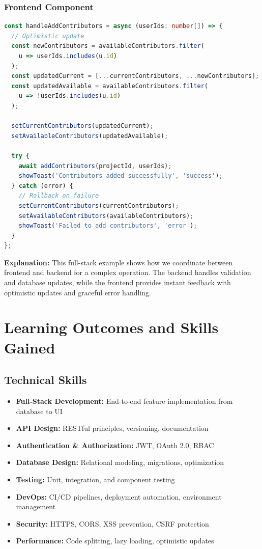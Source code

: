 \documentclass[11pt,a4paper]{article}
\begin{document}
\subsubsection{Frontend Component}
\begin{lstlisting}[language=TypeScript]
const handleAddContributors = async (userIds: number[]) => {
  // Optimistic update
  const newContributors = availableContributors.filter(
    u => userIds.includes(u.id)
  );
  const updatedCurrent = [...currentContributors, ...newContributors];
  const updatedAvailable = availableContributors.filter(
    u => !userIds.includes(u.id)
  );
  
  setCurrentContributors(updatedCurrent);
  setAvailableContributors(updatedAvailable);
  
  try {
    await addContributors(projectId, userIds);
    showToast('Contributors added successfully', 'success');
  } catch (error) {
    // Rollback on failure
    setCurrentContributors(currentContributors);
    setAvailableContributors(availableContributors);
    showToast('Failed to add contributors', 'error');
  }
};
\end{lstlisting}

\textbf{Explanation:} This full-stack example shows how we coordinate between frontend and backend for a complex operation. The backend handles validation and database updates, while the frontend provides instant feedback with optimistic updates and graceful error handling.

\section{Learning Outcomes and Skills Gained}

\subsection{Technical Skills}
\begin{itemize}[leftmargin=*]
    \item \textbf{Full-Stack Development:} End-to-end feature implementation from database to UI
    \item \textbf{API Design:} RESTful principles, versioning, documentation
    \item \textbf{Authentication \& Authorization:} JWT, OAuth 2.0, RBAC
    \item \textbf{Database Design:} Relational modeling, migrations, optimization
    \item \textbf{Testing:} Unit, integration, and component testing
    \item \textbf{DevOps:} CI/CD pipelines, deployment automation, environment management
    \item \textbf{Security:} HTTPS, CORS, XSS prevention, CSRF protection
    \item \textbf{Performance:} Code splitting, lazy loading, optimistic updates
\end{itemize}
\end{document}
